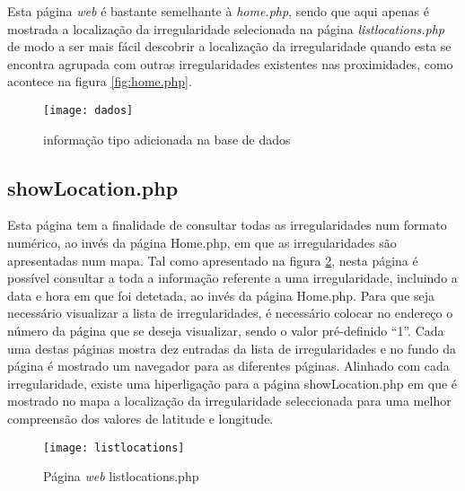 Esta página \emph{web} é bastante semelhante à \emph{home.php}, sendo que aqui apenas é mostrada a localização da irregularidade selecionada na página \emph{listlocations.php} de modo a ser mais fácil descobrir a localização da irregularidade quando esta se encontra agrupada com outras irregularidades existentes nas proximidades, como acontece na figura \ref{fig:home.php}.

\begin{figure}[htbp]
	\centering
	\texttt{[image: dados]}
	\caption{informação tipo adicionada na base de dados}
	\label{fig:informacao_tipo_adicionada_na_base_de_dados}
\end{figure}

\subsection{showLocation.php}
\label{sub:showLocation.php}

Esta página tem a finalidade de consultar todas as irregularidades num formato numérico, ao invés da página Home.php, em que as irregularidades são apresentadas num mapa.
Tal como apresentado na figura \ref{fig:listlocations.php}, nesta página é possível consultar a toda a informação referente a uma irregularidade, incluindo a data e hora em que foi detetada, ao invés da página Home.php.
Para que seja necessário visualizar a lista de irregularidades, é necessário colocar no endereço o número da página que se deseja visualizar, sendo o valor pré-definido “1”.
Cada uma destas páginas mostra dez entradas da lista de irregularidades e no fundo da página é mostrado um navegador para as diferentes páginas. 
Alinhado com cada irregularidade, existe uma hiperligação para a página showLocation.php em que é mostrado no mapa a localização da irregularidade seleccionada para uma melhor compreensão dos valores de latitude e longitude.

\begin{figure}[htbp]
	\centering
	\texttt{[image: listlocations]}
	\caption{Página \emph{web} listlocations.php}
	\label{fig:listlocations.php}
\end{figure}
